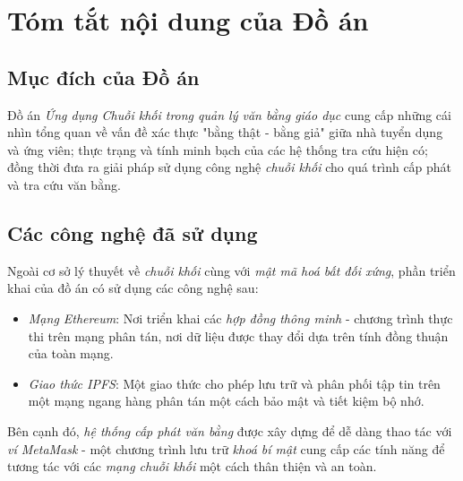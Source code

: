 \section*{
    \centering
    Tóm tắt nội dung của Đồ án
    \vspace{1.25cm}
}

\subsection*{Mục đích của Đồ án}

Đồ án \textit{Ứng dụng Chuỗi khối trong quản lý văn bằng giáo dục} cung cấp những cái nhìn tổng quan về vấn đề xác thực "bằng thật - bằng giả" giữa nhà tuyển dụng và ứng viên; thực trạng và tính minh bạch của các hệ thống tra cứu hiện có; đồng thời đưa ra giải pháp sử dụng công nghệ \textit{chuỗi khối} cho quá trình cấp phát và tra cứu văn bằng.

\subsection*{Các công nghệ đã sử dụng}

Ngoài cơ sở lý thuyết về \textit{chuỗi khối} cùng với \textit{mật mã hoá bất đối xứng}, phần triển khai của đồ án có sử dụng các công nghệ sau:
\begin{itemize}
    \item \textit{Mạng Ethereum}: Nơi triển khai các \textit{hợp đồng thông minh} - chương trình thực thi trên mạng phân tán, nơi dữ liệu được thay đổi dựa trên tính đồng thuận của toàn mạng.
    \item \textit{Giao thức IPFS}: Một giao thức cho phép lưu trữ và phân phối tập tin trên một mạng ngang hàng phân tán một cách bảo mật và tiết kiệm bộ nhớ.
\end{itemize}

Bên cạnh đó, \textit{hệ thống cấp phát văn bằng} được xây dựng để dễ dàng thao tác với \textit{ví MetaMask} - một chương trình lưu trữ \textit{khoá bí mật} cung cấp các tính năng để tương tác với các \textit{mạng chuỗi khối} một cách thân thiện và an toàn.

